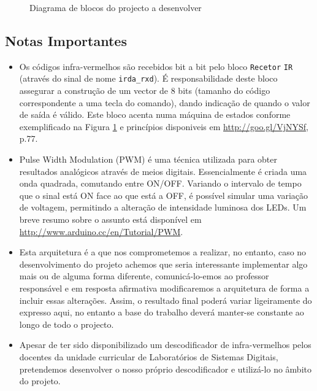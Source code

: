 \documentclass[a4paper,11pt,openright,oneside]{report}
\begin{document}
\begin{figure}[ht]
\center
{}
\caption{Diagrama de blocos do projecto a desenvolver}
\label{fig:ir_leds2}
\end{figure}

\subsection{Notas Importantes}

\begin{itemize}
\item Os códigos infra-vermelhos são recebidos bit a bit pelo bloco \verb|Recetor| \verb|IR| (através do sinal de nome \verb|irda_rxd|). É responsabilidade deste bloco assegurar a construção de um vector de 8 bits (tamanho do código correspondente a uma tecla do comando), dando indicação de quando o valor de saída é válido. Este bloco acenta numa máquina de estados conforme exemplificado na Figura \ref{fig:ir_leds2} e princípios disponiveis em \url{http://goo.gl/VjNYSf}, p.77.
\item Pulse Width Modulation (PWM) é uma técnica utilizada para obter resultados analógicos através de meios digitais. Essencialmente é criada uma onda quadrada, comutando entre ON/OFF. Variando o intervalo de tempo que o sinal está ON face ao que está a OFF, é possível simular uma variação de voltagem, permitindo a alteração de intensidade luminosa dos LEDs. Um breve resumo sobre o assunto está disponível em \url{http://www.arduino.cc/en/Tutorial/PWM}.
\item Esta arquitetura é a que nos comprometemos a realizar, no entanto, caso no desenvolvimento do projeto achemos que seria interessante implementar algo mais ou de alguma forma diferente, comunicá-lo-emos ao professor responsável e em resposta afirmativa modificaremos a arquitetura de forma a incluir essas alterações. Assim, o resultado final poderá variar ligeiramente do expresso aqui, no entanto a base do trabalho deverá manter-se constante ao longo de todo o projecto.
\item Apesar de ter sido disponibilizado um descodificador de infra-vermelhos pelos docentes da unidade curricular de Laboratórios de Sistemas Digitais, pretendemos desenvolver o nosso próprio descodificador e utilizá-lo no âmbito do projeto.
\end{itemize}
\end{document}
